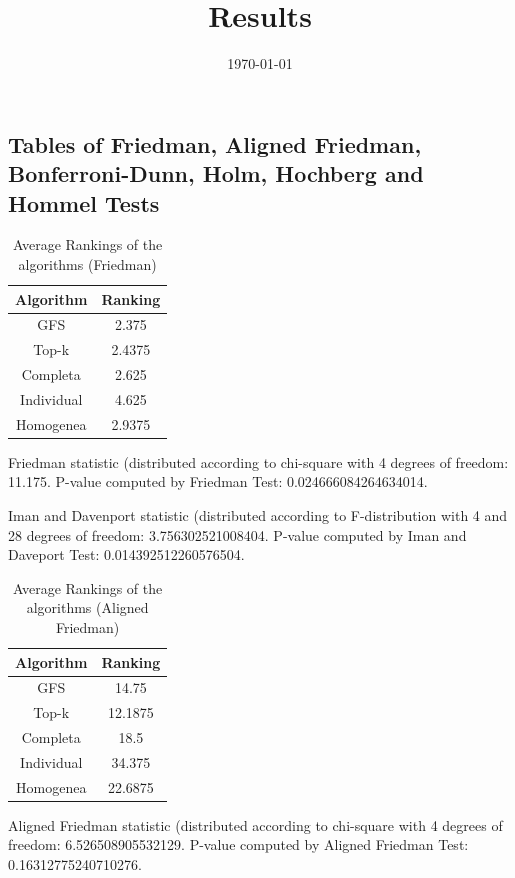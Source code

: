 \documentclass[a4paper,10pt]{article}
\title{Results}
\author{}
\date{\today}
\begin{document}
\begin{landscape}
\oddsidemargin 0in \topmargin 0in\maketitle
\section{Tables of Friedman, Aligned Friedman, Bonferroni-Dunn, Holm, Hochberg and Hommel Tests}
\begin{table}[!htp]
\centering
\caption{Average Rankings of the algorithms (Friedman)
}\begin{tabular}{c|c}
Algorithm&Ranking\\
\hline
GFS&2.375\\
Top-k&2.4375\\
Completa&2.625\\
Individual&4.625\\
Homogenea&2.9375\\
\end{tabular}
\end{table}


Friedman statistic (distributed according to chi-square with 4 degrees of freedom: 11.175. 
P-value computed by Friedman Test: 0.024666084264634014.\newline

Iman and Davenport statistic (distributed according to F-distribution with 4 and 28 degrees of freedom: 3.756302521008404. 
P-value computed by Iman and Daveport Test: 0.014392512260576504.\newline


\newpage

\begin{table}[!htp]
\centering
\caption{Average Rankings of the algorithms (Aligned Friedman)
}\begin{tabular}{c|c}
Algorithm&Ranking\\
\hline
GFS&14.75\\
Top-k&12.1875\\
Completa&18.5\\
Individual&34.375\\
Homogenea&22.6875\\
\end{tabular}
\end{table}


Aligned Friedman statistic (distributed according to chi-square with 4 degrees of freedom: 6.526508905532129. 
P-value computed by Aligned Friedman Test: 0.16312775240710276.\newline



\end{landscape}
\end{document}
